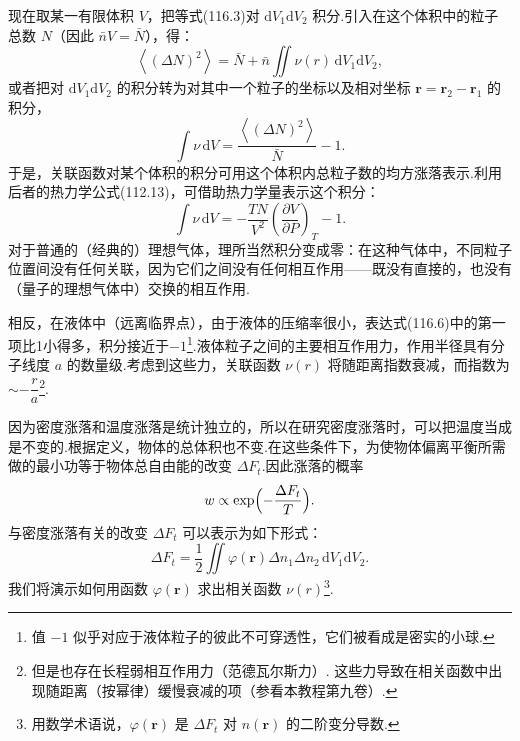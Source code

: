 现在取某一有限体积 $V$，把等式(116.3)对 $\mathrm{d}V_{1}\mathrm{d}V_{2}$ 积分.引入在这个体积中的粒子总数 $N$（因此 $\bar{n}V=\bar{N}$），得：
\begin{equation*}
  \left\langle(\Delta N)^{2}\right\rangle
  =\bar{N}+\bar{n}\iint\nu(r)\,\mathrm{d}V_{1}\mathrm{d}V_{2},
\end{equation*}
或者把对 $\mathrm{d}V_{1}\mathrm{d}V_{2}$ 的积分转为对其中一个粒子的坐标以及相对坐标
$\boldsymbol{r}=\boldsymbol{r}_{2}-\boldsymbol{r}_{1}$ 的积分，
\begin{equation}
  \int\nu\,\mathrm{d}V=\frac{\left\langle(\Delta N)^{2}\right\rangle}{\bar{N}}-1.
\end{equation}
于是，关联函数对某个体积的积分可用这个体积内总粒子数的均方涨落表示.利用后者的热力学公式(112.13)，可借助热力学量表示这个积分：
\begin{equation}
  \int\nu\,\mathrm{d}V=-\frac{TN}{V^{2}}
  \left(\frac{\partial V}{\partial P}\right)_{T}-1.
\end{equation}
对于普通的（经典的）理想气体，理所当然积分变成零：在这种气体中，不同粒子位置间没有任何关联，因为它们之间没有任何相互作用——既没有直接的，也没有（量子的理想气体中）交换的相互作用.

相反，在液体中（远离临界点），由于液体的压缩率很小，表达式(116.6)中的第一项比1小得多，积分接近于$-1$\footnote{值 $-1$ 似乎对应于液体粒子的彼此不可穿透性，它们被看成是密实的小球.}.液体粒子之间的主要相互作用力，作用半径具有分子线度 $a$ 的数量级.考虑到这些力，关联函数 $\nu(r)$ 将随距离指数衰减，而指数为$\sim-\dfrac{r}{a}$\footnote{但是也存在长程弱相互作用力（范德瓦尔斯力）. 这些力导致在相关函数中出现随距离（按幂律）缓慢衰减的项（参看本教程第九卷）.}.

因为密度涨落和温度涨落是统计独立的，所以在研究密度涨落时，可以把温度当成是不变的.根据定义，物体的总体积也不变.在这些条件下，为使物体偏离平衡所需做的最小功等于物体总自由能的改变 $\Delta F_{t}$.因此涨落的概率
\begin{equation}
  w\propto\exp\Bigl(-\frac{\Delta F_{t}}{T}\Bigr).
\end{equation}
与密度涨落有关的改变 $\Delta F_{t}$ 可以表示为如下形式：
\begin{equation}
  \Delta F_{t}=\frac{1}{2}\iint\varphi(\boldsymbol{r})
  \Delta n_{1}\Delta n_{2}\,\mathrm{d}V_{1}\mathrm{d}V_{2}.
\end{equation}
我们将演示如何用函数 $\varphi(\boldsymbol{r})$ 求出相关函数 $\nu(r)$\footnote{用数学术语说，$\varphi(\boldsymbol{r})$ 是 $\Delta F_{t}$ 对 $n(\boldsymbol{r})$ 的二阶变分导数.}.

